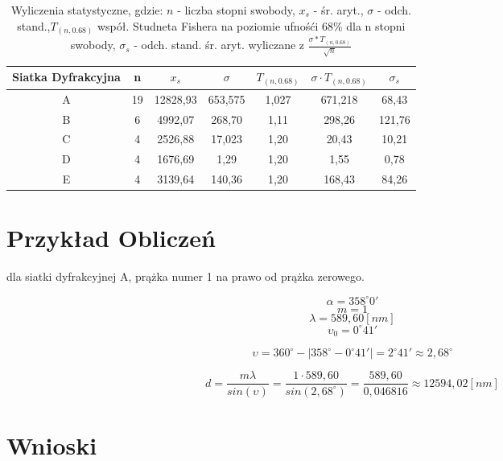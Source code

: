 \documentclass{article}
\begin{document}
\begin{table}[!ht]
    \centering
    \begin{tabular}{|c|c|c|c|c|c|c|}
    \hline
        Siatka Dyfrakcyjna & n & $x_s$ & $\sigma$& $T_{(n, 0.68)}$& $\sigma \cdot T_{(n 
, 0.68)}$ &$\sigma_s$ \\ \hline
        A & 19 & 12828,93 & 653,575 & 1,027 & 671,218 &  68,43 \\ \hline
        B & 6 & 4992,07 & 268,70 & 1,11 & 298,26 & 121,76 \\ \hline
        C & 4 & 2526,88 & 17,023 & 1,20 & 20,43 &  10,21 \\ \hline
        D & 4 & 1676,69 & 1,29 & 1,20 & 1,55 & 0,78 \\ \hline
        E & 4 & 3139,64 & 140,36 & 1,20 & 168,43 & 84,26 \\ \hline
    \end{tabular}
    \caption{Wyliczenia statystyczne, gdzie: $n$ - liczba stopni swobody, $x_s$ - śr. aryt., $\sigma$ - odch. stand.,$T_{(n 
, 0.68)}$  współ. Studneta Fishera na poziomie ufnośći 68\% dla n stopni swobody, $\sigma_s$ - odch. stand. śr. aryt. wyliczane z  $\frac{\sigma * T_{(n 
, 0.68)}}{\sqrt{n}} $ }
\end{table}

\FloatBarrier

\section*{Przykład Obliczeń}

dla siatki dyfrakcyjnej A, prążka numer 1 na prawo od prążka zerowego. 

\[\alpha = 358^\circ0'\]
\[m = 1\]
\[\lambda =589,60[nm]\]
\[\upsilon_0 = 0^\circ 41'\]

\[ \upsilon = 360^\circ - |358^\circ - 0^\circ41'| = 2^\circ 41' \approx 2,68^\circ\]

\[ d = \frac{m \lambda}{sin(\upsilon)} = \frac{1\cdot 589,60}{sin(2,68^\circ)} = \frac{589,60}{0,046816} \approx 12594,02[nm]\]

\FloatBarrier

\section*{Wnioski}
\end{document}
